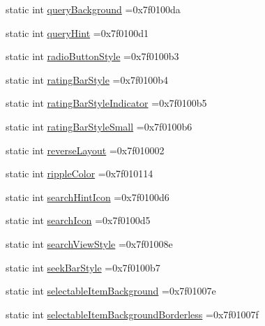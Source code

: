 \begin{DoxyCompactItemize}
\item 
static int \hyperlink{classandroid_1_1support_1_1v7_1_1mediarouter_1_1R_1_1attr_aef2a1d8758be769981a6f328628b5353}{query\+Background} =0x7f0100da
\item 
static int \hyperlink{classandroid_1_1support_1_1v7_1_1mediarouter_1_1R_1_1attr_abeee02032ebb8d80eca5e69bb2f3e84b}{query\+Hint} =0x7f0100d1
\item 
static int \hyperlink{classandroid_1_1support_1_1v7_1_1mediarouter_1_1R_1_1attr_a1879851274fd4f59cc148d48886e3dce}{radio\+Button\+Style} =0x7f0100b3
\item 
static int \hyperlink{classandroid_1_1support_1_1v7_1_1mediarouter_1_1R_1_1attr_a19ff1f11c2808ded29e99126ee9999ac}{rating\+Bar\+Style} =0x7f0100b4
\item 
static int \hyperlink{classandroid_1_1support_1_1v7_1_1mediarouter_1_1R_1_1attr_a6da633064108a481fdd0b21392b9ef0e}{rating\+Bar\+Style\+Indicator} =0x7f0100b5
\item 
static int \hyperlink{classandroid_1_1support_1_1v7_1_1mediarouter_1_1R_1_1attr_a715bb6d074e1060db1eaa65d018f0d65}{rating\+Bar\+Style\+Small} =0x7f0100b6
\item 
static int \hyperlink{classandroid_1_1support_1_1v7_1_1mediarouter_1_1R_1_1attr_ad202a35ffdff81d10cb206fd09682d56}{reverse\+Layout} =0x7f010002
\item 
static int \hyperlink{classandroid_1_1support_1_1v7_1_1mediarouter_1_1R_1_1attr_a59f40623f4a63402618d7afbde45845f}{ripple\+Color} =0x7f010114
\item 
static int \hyperlink{classandroid_1_1support_1_1v7_1_1mediarouter_1_1R_1_1attr_a4124d3b7efb541e2235056b317ac4f4b}{search\+Hint\+Icon} =0x7f0100d6
\item 
static int \hyperlink{classandroid_1_1support_1_1v7_1_1mediarouter_1_1R_1_1attr_a86c45b75b0c4e4e5fa1de4a74e677040}{search\+Icon} =0x7f0100d5
\item 
static int \hyperlink{classandroid_1_1support_1_1v7_1_1mediarouter_1_1R_1_1attr_a7f04c9e947e8e75cd0c7e00a8dd23370}{search\+View\+Style} =0x7f01008e
\item 
static int \hyperlink{classandroid_1_1support_1_1v7_1_1mediarouter_1_1R_1_1attr_a6a80804b15540907133815a78dc78390}{seek\+Bar\+Style} =0x7f0100b7
\item 
static int \hyperlink{classandroid_1_1support_1_1v7_1_1mediarouter_1_1R_1_1attr_a64acf946f49f574fc151db8f6e8a22f4}{selectable\+Item\+Background} =0x7f01007e
\item 
static int \hyperlink{classandroid_1_1support_1_1v7_1_1mediarouter_1_1R_1_1attr_af9f31b51ae90ebbc274d859480b076b7}{selectable\+Item\+Background\+Borderless} =0x7f01007f

\end{DoxyCompactItemize}
